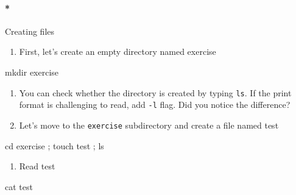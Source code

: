 \documentclass[
  letterpaper,
  DIV=11,
  numbers=noendperiod]{scrreprt}
\let\oldparagraph\paragraph
\renewcommand{\paragraph}[1]{\oldparagraph{#1}\mbox{}}
\newenvironment{Shaded}{\begin{snugshade}}{\end{snugshade}}
\newcommand{\BuiltInTok}[1]{\textcolor[rgb]{0.00,0.23,0.31}{#1}}
\newcommand{\FunctionTok}[1]{\textcolor[rgb]{0.28,0.35,0.67}{#1}}
\newcommand{\KeywordTok}[1]{\textcolor[rgb]{0.00,0.23,0.31}{#1}}
\newcommand{\NormalTok}[1]{\textcolor[rgb]{0.00,0.23,0.31}{#1}}
\providecommand{\tightlist}{%
  \setlength{\itemsep}{0pt}\setlength{\parskip}{0pt}}\usepackage{longtable,booktabs,array}
\begin{document}
\hypertarget{creating-files}{%
\paragraph*{Creating files}\label{creating-files}}

\begin{enumerate}
\def\labelenumi{\arabic{enumi}.}
\tightlist
\item
  First, let's create an empty directory named exercise
\end{enumerate}

\begin{Shaded}
\begin{Highlighting}[]

\FunctionTok{mkdir}\NormalTok{ exercise }
\end{Highlighting}
\end{Shaded}

\begin{enumerate}
\def\labelenumi{\arabic{enumi}.}
\setcounter{enumi}{1}
\item
  You can check whether the directory is created by typing \texttt{ls}.
  If the print format is challenging to read, add \texttt{-l} flag. Did
  you notice the difference?
\item
  Let's move to the \texttt{exercise} subdirectory and create a file
  named test
\end{enumerate}

\begin{Shaded}
\begin{Highlighting}[]

\BuiltInTok{cd}\NormalTok{ exercise }\KeywordTok{;} \FunctionTok{touch}\NormalTok{ test }\KeywordTok{;} \FunctionTok{ls} 
\end{Highlighting}
\end{Shaded}

\begin{enumerate}
\def\labelenumi{\arabic{enumi}.}
\setcounter{enumi}{3}
\tightlist
\item
  Read test
\end{enumerate}

\begin{Shaded}
\begin{Highlighting}[]

\FunctionTok{cat}\NormalTok{ test }
\end{Highlighting}
\end{Shaded}
\end{document}
